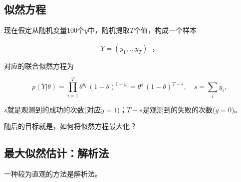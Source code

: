     \begin{center}
    \end{center}
    { \hspace*{\fill} \\}

\subsection{似然方程}\label{ux4f3cux7136ux65b9ux7a0b}
现在假定从随机变量100个\(y\)中，随机提取\(T\)个值，构成一个样本

\begin{equation}
Y = \left(y_1, \ldots y_{T} \right)^{\top}，
\end{equation}

对应的联合似然方程为

\begin{equation}
p(Y|\theta) = \prod_{i=1}^{T} \theta^{y_{i}} \, \left( 1 - \theta \right)^{1-y_{i}} = \theta^{s} \, \left( 1-\theta \right)^{T - s}, \quad s = \sum_{i} y_{i},
\end{equation}

\(s\)就是观测到的成功的次数(对应\(y=1\))；\(T-s\)是观测到的失败的次数(\(y=0\))。

随后的目标就是，如何将似然方程最大化？

\subsection{最大似然估计：解析法}
\label{ux6700ux5927ux4f3cux7136ux4f30ux8ba1ux89e3ux6790ux6cd5}

一种较为直观的方法是解析法。

